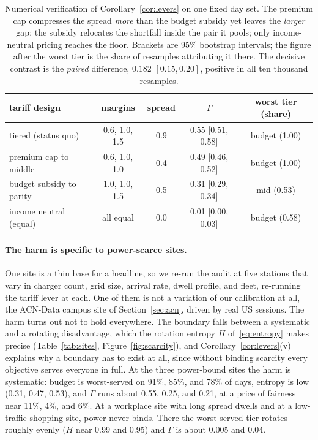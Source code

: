 \documentclass[manuscript, screen, review, anonymous]{acmart}
\begin{document}
\begin{table}[t]
\centering
\small
\setlength{\tabcolsep}{4pt}
\caption{Numerical verification of Corollary~\ref{cor:levers} on one fixed day set. The premium cap compresses the spread \emph{more} than the budget subsidy yet leaves the \emph{larger} gap; the subsidy relocates the shortfall inside the pair it pools; only income-neutral pricing reaches the floor. Brackets are $95\%$ bootstrap intervals; the figure after the worst tier is the share of resamples attributing it there. The decisive contrast is the \emph{paired} difference, $0.182$ $[0.15, 0.20]$, positive in all ten thousand resamples.}
\label{tab:tariff}
\begin{tabular}{lcccc}
\toprule
tariff design & margins & spread & $\Gamma$ & worst tier (share) \\
\midrule
tiered (status quo)      & 0.6, 1.0, 1.5 & 0.9 & 0.55 [0.51, 0.58] & budget (1.00) \\
premium cap to middle    & 0.6, 1.0, 1.0 & 0.4 & 0.49 [0.46, 0.52] & budget (1.00) \\
budget subsidy to parity & 1.0, 1.0, 1.5 & 0.5 & 0.31 [0.29, 0.34] & mid (0.53) \\
income neutral (equal)   & all equal     & 0.0 & 0.01 [0.00, 0.03] & budget (0.58) \\
\bottomrule
\end{tabular}
\end{table}

\paragraph{The harm is specific to power-scarce sites.}
One site is a thin base for a headline, so we re-run the audit at five stations that vary in charger count, grid size, arrival rate, dwell profile, and fleet, re-running the tariff lever at each. One of them is not a variation of our calibration at all, the ACN-Data campus site of Section~\ref{sec:acn}, driven by real US sessions. The harm turns out not to hold everywhere. The boundary falls between a systematic and a rotating disadvantage, which the rotation entropy $H$ of~\eqref{eq:entropy} makes precise (Table~\ref{tab:sites}, Figure~\ref{fig:scarcity}), and Corollary~\ref{cor:levers}(v) explains why a boundary has to exist at all, since without binding scarcity every objective serves everyone in full. At the three power-bound sites the harm is systematic: budget is worst-served on 91\%, 85\%, and 78\% of days, entropy is low (0.31, 0.47, 0.53), and $\Gamma$ runs about 0.55, 0.25, and 0.21, at a price of fairness near 11\%, 4\%, and 6\%. At a workplace site with long spread dwells and at a low-traffic shopping site, power never binds. There the worst-served tier rotates roughly evenly ($H$ near 0.99 and 0.95) and $\Gamma$ is about 0.005 and 0.04.
\end{document}

